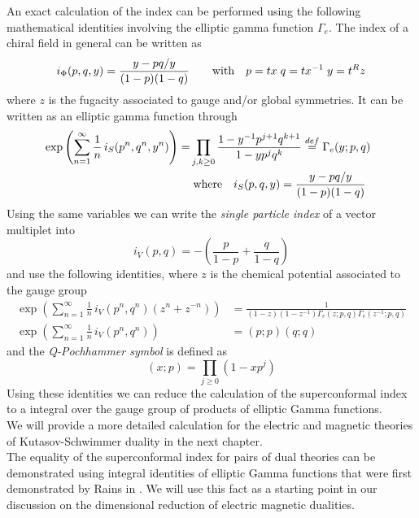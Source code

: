 An exact calculation of the index can be performed using the following mathematical identities involving the elliptic gamma function $\Gamma_e$.
The index of a chiral field in general can be written as
\begin{equation}
i_{\Phi} (p,q,y) = \frac{y - pq/y}{(1-p)(1-q)} \qquad \hbox{with} \quad p=tx \; q=t x^{-1} \; y = t^R z 
\end{equation}
where $z$ is the fugacity associated to gauge and/or global symmetries.
It can be written as an elliptic gamma function through
\begin{align}
 \exp \left(  
\sum_{n=1}^{\infty} \frac{1}{n} \, i_S(p^n,q^n,y^n) \right)=
& \prod_{j,k \geq 0} \frac{1 - y^{-1}p^{j+1}q^{k+1}}{1 - y p^j q^k}
\overset{def}{=} 
\Gamma_e ( y; p, q) 
\\
& \; \hbox{where} \quad i_S(p,q,y) = \frac{y - pq/y}{(1-p)(1-q)} \quad
\end{align}
Using the same variables we can write the \emph{single particle index} of a vector multiplet into
\begin{equation}
i_V(p,q) = - \left( \frac{p}{1-p} + \frac{q}{1-q} \right)
\end{equation}
and use the following identities, where $z$ is the chemical potential associated to the gauge group
\begin{align}
\exp \left(  
\sum_{n=1}^{\infty} \frac{1}{n}\, i_V(p^n,q^n) ( z^n + z^{-n}) \right) & = \frac{1}{(1-z)(1-z^{-1}) \Gamma_e(z;p,q) \Gamma_e(z^{-1};p,q)}
\\
\exp \left(
\sum_{n=1}^{\infty} \frac{1}{n} \, i_V(p^n,q^n) \right) & = (p;p) (q;q)
\end{align}
and the \emph{Q-Pochhammer symbol} is defined as
\begin{equation}
(x;p) = \prod_{j \geq 0} ( 1- x p^j)
\end{equation}
Using these identities we can reduce the calculation of the superconformal index to a integral over the gauge group of products of elliptic Gamma functions.\\
We will provide a more detailed calculation for the electric and magnetic theories of Kutasov-Schwimmer duality in the next chapter.
\\
The equality of the superconformal index for pairs of dual theories can be demonstrated using integral identities of elliptic Gamma functions that were first demonstrated by Rains in \cite{rains309252transformations}.
We will use this fact as a starting point in our discussion on the dimensional reduction of electric magnetic dualities.








